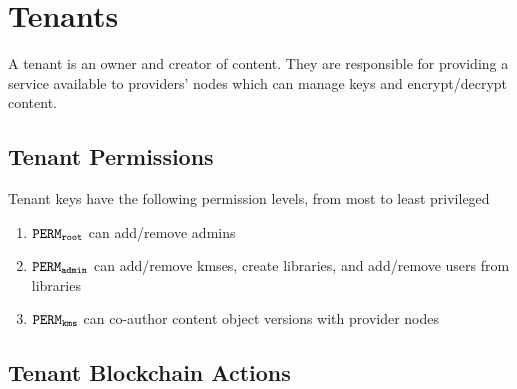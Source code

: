 \documentclass{article}
\begin{document}
\section{Tenants}

A tenant is an owner and creator of content. They are responsible for providing a service available to providers' nodes which can manage keys and encrypt/decrypt content.


\subsection{Tenant Permissions}
Tenant keys have the following permission levels, from most to least privileged

\begin{enumerate}
  \item $\mathtt{PERM_{root}}$ can add/remove admins
  \item $\mathtt{PERM_{admin}}$ can add/remove kmses, create libraries, and add/remove users from libraries
  \item $\mathtt{PERM_{kms}}$ can co-author content object versions with provider nodes
\end{enumerate}

\subsection{Tenant Blockchain Actions}
\end{document}
